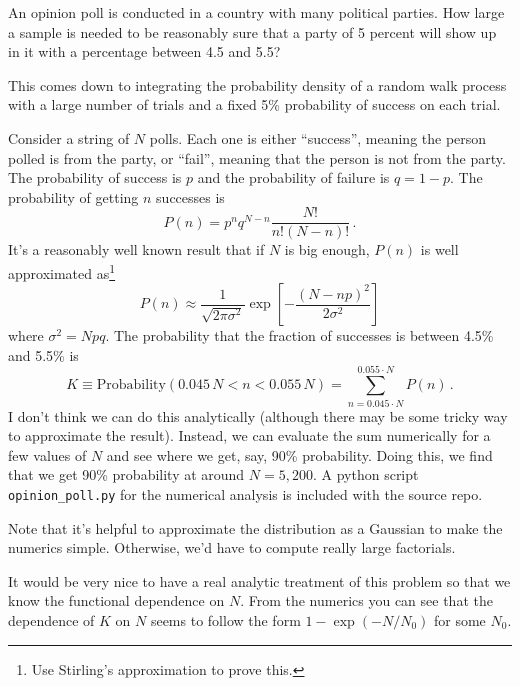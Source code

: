 

An opinion poll is conducted in a country with many political parties.
How large a sample is needed to be reasonably sure that a party of 5 percent will show up in it with a percentage between 4.5 and 5.5?


This comes down to integrating the probability density of a random walk process with a large number of trials and a fixed 5\% probability of success on each trial.

Consider a string of $N$ polls.
Each one is either ``success'', meaning the person polled is from the party, or ``fail'', meaning that the person is not from the party.
The probability of success is $p$ and the probability of failure is $q = 1 - p$.
The probability of getting $n$ successes is
\begin{equation*}
P(n) = p^n q^{N-n} \frac{N!}{n! (N-n)!} \, .
\end{equation*}
It's a reasonably well known result that if $N$ is big enough, $P(n)$ is well approximated as\footnote{Use Stirling's approximation to prove this.}
\begin{equation*}
P(n) \approx \frac{1}{\sqrt{2\pi \sigma^2}} \exp \left[ - \frac{(N - np)^2}{2 \sigma^2}\right]
\end{equation*}
where $\sigma^2 = Npq$.
The probability that the fraction of successes is between 4.5\% and 5.5\% is
\begin{equation*}
K \equiv \text{Probability}(0.045\,N < n < 0.055\,N) = \sum_{n=0.045 \cdot N}^{0.055 \cdot N} P(n) \, .
\end{equation*}
I don't think we can do this analytically (although there may be some tricky way to approximate the result).
Instead, we can evaluate the sum numerically for a few values of $N$ and see where we get, say, 90\% probability.
Doing this, we find that we get 90\% probability at around $N=5,200$.
A python script \texttt{opinion\_poll.py} for the numerical analysis is included with the source repo.

Note that it's helpful to approximate the distribution as a Gaussian to make the numerics simple.
Otherwise, we'd have to compute really large factorials.

It would be very nice to have a real analytic treatment of this problem so that we know the functional dependence on $N$.
From the numerics you can see that the dependence of $K$ on $N$ seems to follow the form $1 - \exp(-N/N_0)$ for some $N_0$.
